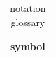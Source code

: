 \begin{table}[h]
\centering
\begin{tabular}{|c|}
\hline
symbol \\ \hline
\hline
\end{tabular}
\caption{notation glossary}
\label{tab:T18}
\end{table}

